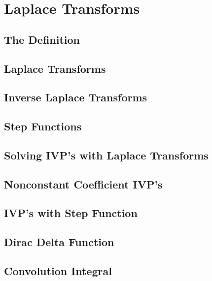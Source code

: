 \documentclass[../satmath.tex]{subfiles}
\begin{document}
\chapter{Laplace Transforms}
\section{The Definition}
\section{Laplace Transforms}
\section{Inverse Laplace Transforms}
\section{Step Functions}
\section{Solving IVP's with Laplace Transforms}
\section{Nonconstant Coefficient IVP's}
\section{IVP's with Step Function}
\section{Dirac Delta Function}
\section{Convolution Integral}
\end{document}
